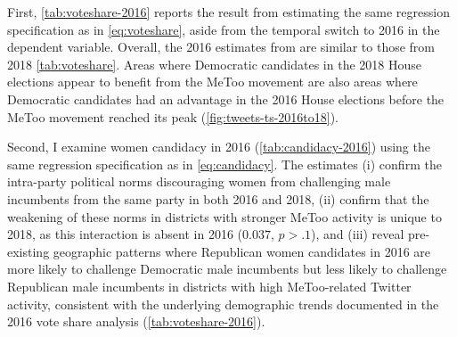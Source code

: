 \documentclass[manuscript,screen,nonacm,11pt,acm]{acmart}
\begin{document}
\begin{bibunit}
First, \cref{tab:voteshare-2016} reports the result from estimating the same regression specification as in \cref{eq:voteshare}, aside from the temporal switch to 2016 in the dependent variable.
Overall, the 2016 estimates from are similar to those from 2018 \cref{tab:voteshare}. 
Areas where Democratic candidates in the 2018 House elections appear to benefit from the MeToo movement are also areas where Democratic candidates had an advantage in the 2016 House elections before the MeToo movement reached its peak (\cref{fig:tweets-ts-2016to18}).

Second, I examine women candidacy in 2016 (\cref{tab:candidacy-2016}) using the same regression specification as in \cref{eq:candidacy}.
The estimates (i) confirm the intra-party political norms discouraging women from challenging male incumbents from the same party in both 2016 and 2018, (ii) confirm that the weakening of these norms in districts with stronger MeToo activity is unique to 2018, as this interaction is absent in 2016 ($0.037$, $p > .1$), and (iii) reveal pre-existing geographic patterns where Republican women candidates in 2016 are more likely to challenge Democratic male incumbents but less likely to challenge Republican male incumbents in districts with high MeToo-related Twitter activity, consistent with the underlying demographic trends documented in the 2016 vote share analysis (\cref{tab:voteshare-2016}).


\end{bibunit}
\end{document}
